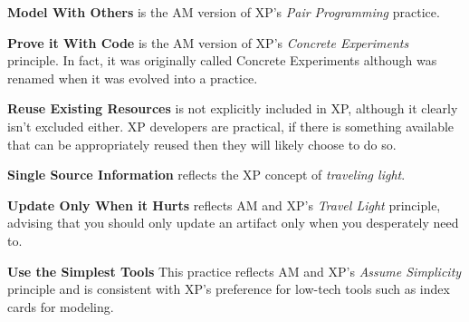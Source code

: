 {\bf Model With Others} is the AM version of XP's \emph{Pair Programming}
practice.

{\bf Prove it With Code} is the AM version of XP's \emph{Concrete Experiments}
principle. In fact, it was originally called Concrete Experiments although was
renamed when it was evolved into a practice.

{\bf Reuse Existing Resources} is not explicitly included in XP, although it
clearly isn't excluded either. XP developers are practical, if there is
something available that can be appropriately reused then they will likely
choose to do so.

{\bf Single Source Information} reflects the XP concept of \emph{traveling
light}.

{\bf Update Only When it Hurts} reflects AM and XP's \emph{Travel Light}
principle, advising that you should only update an artifact only when you
desperately need to.

{\bf Use the Simplest Tools} This practice reflects AM and XP's \emph{Assume
Simplicity} principle and is consistent with XP's preference for low-tech tools
such as index cards for modeling.\cite{AM}